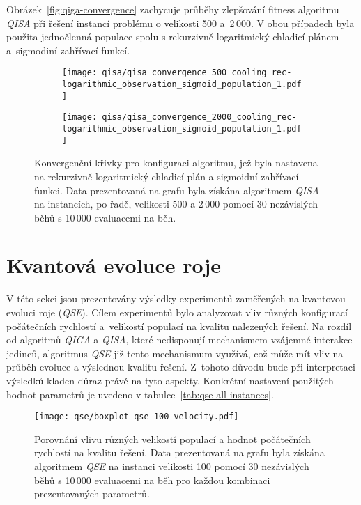 Obrázek~\ref{fig:qiga-convergence} zachycuje průběhy zlepšování fitness algoritmu \emph{QISA} při řešení instancí problému o velikosti 500 a~2\,000. 
V obou případech byla použita jednočlenná populace spolu s rekurzivně-logaritmický chladicí plánem a~sigmodiní zahřívací funkcí.

\begin{figure}[ht!]
    \centering
    \begin{subfigure}[b]{0.48\textwidth}
      \texttt{[image: qisa/qisa\_convergence\_500\_cooling\_rec-logarithmic\_observation\_sigmoid\_population\_1.pdf]}
    \end{subfigure}
    \hfill
    \begin{subfigure}[b]{0.48\textwidth}
        \texttt{[image: qisa/qisa\_convergence\_2000\_cooling\_rec-logarithmic\_observation\_sigmoid\_population\_1.pdf]}
    \end{subfigure}
    \caption{Konvergenční křivky pro konfiguraci algoritmu, jež byla nastavena na rekurzivně-logaritmický chladicí plán a sigmoidní zahřívací funkci. Data prezentovaná na grafu byla získána algoritmem \emph{QISA} na instancích, po řadě, velikosti 500 a 2\,000 pomocí 30 nezávislých běhů s 10\,000 evaluacemi na běh.}
    \label{fig:qisa-convergence}
\end{figure}

\section{Kvantová evoluce roje}\label{sec:exp-qse}
V této sekci jsou prezentovány výsledky experimentů zaměřených na kvantovou evoluci roje (\emph{QSE}). 
Cílem experimentů bylo analyzovat vliv různých konfigurací počátečních rychlostí a~velikostí populací na kvalitu nalezených řešení. 
Na rozdíl od algoritmů \emph{QIGA} a \emph{QISA}, které nedisponují mechanismem vzájemné interakce jedinců, algoritmus \emph{QSE} již tento mechanismum využívá, což může mít vliv na průběh evoluce a výslednou kvalitu řešení. 
Z~tohoto důvodu bude při interpretaci výsledků kladen důraz právě na tyto aspekty.
Konkrétní nastavení použitých hodnot parametrů je uvedeno v tabulce~\ref{tab:qse-all-instances}. 

\begin{figure}[ht!]
    \centering
    \texttt{[image: qse/boxplot\_qse\_100\_velocity.pdf]}
    \caption{Porovnání vlivu různých velikostí populací a hodnot počátečních rychlostí na kvalitu řešení. Data prezentovaná na grafu byla získána algoritmem \emph{QSE} na instanci velikosti 100 pomocí 30 nezávislých běhů s 10\,000 evaluacemi na běh pro každou kombinaci prezentovaných parametrů.}
    \label{fig:qse-100-all}
\end{figure}

